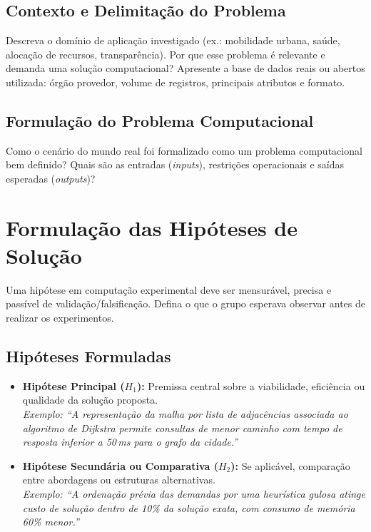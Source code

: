 \documentclass[11pt,a4paper]{article}
\begin{document}
\subsection{Contexto e Delimitação do Problema}
Descreva o domínio de aplicação investigado (ex.: mobilidade urbana, saúde, alocação de recursos, transparência). Por que esse problema é relevante e demanda uma solução computacional? Apresente a base de dados reais ou abertos utilizada: órgão provedor, volume de registros, principais atributos e formato.

\subsection{Formulação do Problema Computacional}
Como o cenário do mundo real foi formalizado como um problema computacional bem definido? Quais são as entradas (\textit{inputs}), restrições operacionais e saídas esperadas (\textit{outputs})?

\section{Formulação das Hipóteses de Solução}

\begin{instrucao}
Uma hipótese em computação experimental deve ser mensurável, precisa e passível de validação/falsificação. Defina o que o grupo esperava observar antes de realizar os experimentos.
\end{instrucao}

\subsection{Hipóteses Formuladas}
\begin{itemize}
    \item \textbf{Hipótese Principal ($H_1$):} Premissa central sobre a viabilidade, eficiência ou qualidade da solução proposta. \\
    \textit{Exemplo: ``A representação da malha por lista de adjacências associada ao algoritmo de Dijkstra permite consultas de menor caminho com tempo de resposta inferior a 50\,ms para o grafo da cidade.''}
    \item \textbf{Hipótese Secundária ou Comparativa ($H_2$):} Se aplicável, comparação entre abordagens ou estruturas alternativas. \\
    \textit{Exemplo: ``A ordenação prévia das demandas por uma heurística gulosa atinge custo de solução dentro de 10\% da solução exata, com consumo de memória 60\% menor.''}
\end{itemize}
\end{document}
